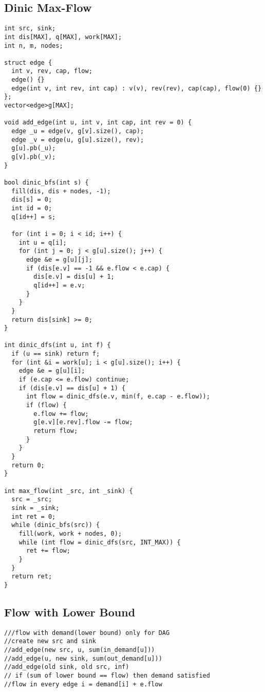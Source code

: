 \documentclass[10pt,a4paper,onesided]{article}
\begin{document}
\begin{multicols*}{3}
\subsection{Dinic Max-Flow}
\begin{lstlisting}
int src, sink;
int dis[MAX], q[MAX], work[MAX];
int n, m, nodes;

struct edge {
  int v, rev, cap, flow;
  edge() {}
  edge(int v, int rev, int cap) : v(v), rev(rev), cap(cap), flow(0) {}
};
vector<edge>g[MAX];

void add_edge(int u, int v, int cap, int rev = 0) {
  edge _u = edge(v, g[v].size(), cap);
  edge _v = edge(u, g[u].size(), rev);
  g[u].pb(_u);
  g[v].pb(_v);
}

bool dinic_bfs(int s) {
  fill(dis, dis + nodes, -1);
  dis[s] = 0;
  int id = 0;
  q[id++] = s;

  for (int i = 0; i < id; i++) {
    int u = q[i];
    for (int j = 0; j < g[u].size(); j++) {
      edge &e = g[u][j];
      if (dis[e.v] == -1 && e.flow < e.cap) {
        dis[e.v] = dis[u] + 1;
        q[id++] = e.v;
      }
    }
  }
  return dis[sink] >= 0;
}

int dinic_dfs(int u, int f) {
  if (u == sink) return f;
  for (int &i = work[u]; i < g[u].size(); i++) {
    edge &e = g[u][i];
    if (e.cap <= e.flow) continue;
    if (dis[e.v] == dis[u] + 1) {
      int flow = dinic_dfs(e.v, min(f, e.cap - e.flow));
      if (flow) {
        e.flow += flow;
        g[e.v][e.rev].flow -= flow;
        return flow;
      }
    }
  }
  return 0;
}

int max_flow(int _src, int _sink) {
  src = _src;
  sink = _sink;
  int ret = 0;
  while (dinic_bfs(src)) {
    fill(work, work + nodes, 0);
    while (int flow = dinic_dfs(src, INT_MAX)) {
      ret += flow;
    }
  }
  return ret;
}
\end{lstlisting}
\subsection{Flow with Lower Bound}
\begin{lstlisting}
///flow with demand(lower bound) only for DAG
//create new src and sink
//add_edge(new src, u, sum(in_demand[u]))
//add_edge(u, new sink, sum(out_demand[u]))
//add_edge(old sink, old src, inf)
// if (sum of lower bound == flow) then demand satisfied
//flow in every edge i = demand[i] + e.flow
\end{lstlisting}

\end{multicols*}
\end{document}
